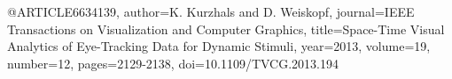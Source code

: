 @ARTICLE{6634139,
  author={K. {Kurzhals} and D. {Weiskopf}},
  journal={IEEE Transactions on Visualization and Computer Graphics}, 
  title={Space-Time Visual Analytics of Eye-Tracking Data for Dynamic Stimuli}, 
  year={2013},
  volume={19},
  number={12},
  pages={2129-2138},
  doi={10.1109/TVCG.2013.194}}